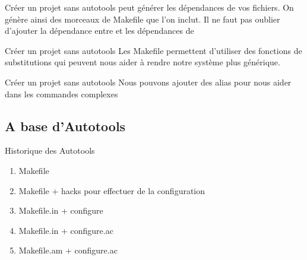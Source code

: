\begin{frame}[fragile=singleslide]{Créer un projet sans autotools}
   peut  générer les dépendances de vos  fichiers.  On génère
  ainsi  des morceaux  de Makefile  que l'on  inclut. Il  ne  faut pas
  oublier   d'ajouter  la  dépendance   entre     et  les
  dépendances de 
  
\end{frame}

\begin{frame}[fragile=singleslide]{Créer un projet sans autotools}
  Les  Makefile permettent d'utiliser  des fonctions  de substitutions
  qui  peuvent  nous aider  à  rendre  notre  système plus  générique.
  
\end{frame}

\begin{frame}[fragile=singleslide]{Créer un projet sans autotools}
  Nous pouvons  ajouter des alias  pour nous aider dans  les commandes
  complexes 
  
\end{frame}

\subsection{A base d'Autotools}

\begin{frame}[fragile=singleslide]{Historique des Autotools}
  \begin{enumerate}
  \item Makefile
  \item Makefile + hacks pour effectuer de la configuration
  \item Makefile.in + configure
  \item Makefile.in + configure.ac
  \item Makefile.am + configure.ac
  \end{enumerate}
\end{frame}


